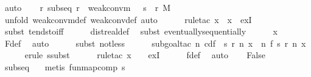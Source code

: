 \documentclass[leqno]{article}
\theoremstyle{definition}
\begin{document}
\begin{isabellebody}
\ auto\isanewline
\ \ \isamarkupfalse%
\ {\isachardoublequoteopen}{\isasymAnd}r{\isachardot}\ subseq\ r\ {\isasymLongrightarrow}\ {\isasymnot}weak{\isacharunderscore}conv{\isacharunderscore}m\ {\isacharparenleft}{\isasymmu}\ {\isasymcirc}\ s\ {\isasymcirc}\ r{\isacharparenright}\ M{\isachardoublequoteclose}\isanewline
\ \ \ \ \isamarkupfalse%
\ {\isacharparenleft}unfold\ weak{\isacharunderscore}conv{\isacharunderscore}m{\isacharunderscore}def\ weak{\isacharunderscore}conv{\isacharunderscore}def{\isacharcomma}\ auto{\isacharparenright}\isanewline
\ \ \ \ \isamarkupfalse%
\ {\isacharparenleft}rule{\isacharunderscore}tac\ x\ {\isacharequal}\ x\ \ exI{\isacharparenright}\isanewline
\ \ \ \ \isamarkupfalse%
\ {\isacharparenleft}subst\ tendsto{\isacharunderscore}iff{\isacharparenright}\isanewline
\ \ \ \ \isamarkupfalse%
\ dist{\isacharunderscore}real{\isacharunderscore}def\ \isamarkupfalse%
\ {\isacharparenleft}subst\ eventually{\isacharunderscore}sequentially{\isacharparenright}\isanewline
\ \ \ \ \isamarkupfalse%
\ x\ \isamarkupfalse%
\ F{\isacharunderscore}def\ \isamarkupfalse%
\ auto\isanewline
\ \ \ \ \isamarkupfalse%
\ {\isacharparenleft}subst\ not{\isacharunderscore}less{\isacharparenright}\isanewline
\ \ \ \ \isamarkupfalse%
\ {\isacharparenleft}subgoal{\isacharunderscore}tac\ {\isachardoublequoteopen}{\isacharparenleft}{\isasymlambda}n{\isachardot}\ cdf\ {\isacharparenleft}{\isasymmu}\ {\isacharparenleft}s\ {\isacharparenleft}r\ n{\isacharparenright}{\isacharparenright}{\isacharparenright}\ x{\isacharparenright}\ {\isacharequal}\ {\isacharparenleft}{\isasymlambda}n{\isachardot}\ f\ {\isacharparenleft}s\ {\isacharparenleft}r\ n{\isacharparenright}{\isacharparenright}\ x{\isacharparenright}{\isachardoublequoteclose}{\isacharparenright}\isanewline
\ \ \ \ \isamarkupfalse%
\ {\isacharparenleft}erule\ ssubst{\isacharparenright}\isanewline
\ \ \ \ \isamarkupfalse%
\ {\isacharparenleft}rule{\isacharunderscore}tac\ x\ {\isacharequal}\ {\isasymepsilon}\ \ exI{\isacharparenright}\isanewline
\ \ \ \ \isamarkupfalse%
\ f{\isacharunderscore}def\ \isamarkupfalse%
\ auto\isanewline
\ \ \isamarkupfalse%
\ False\ \isamarkupfalse%
\ subseq\ {\isacharasterisk}\ \isamarkupfalse%
\ {\isacharparenleft}metis\ fun{\isachardot}map{\isacharunderscore}comp\ s{\isacharparenright}\ \isanewline
{}
\end{isabellebody}
\end{document}
